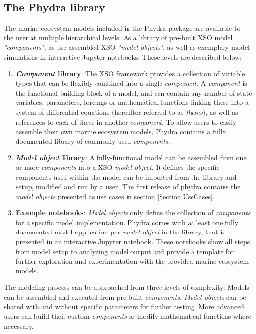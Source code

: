 \documentclass[journal abbreviation, manuscript]{copernicus}
\begin{document}
\subsection{The Phydra library} \label{Section:PhydraLibrary}
The marine ecosystem models included in the Phydra package are available to the user at multiple hierarchical levels: As a library of pre-built XSO model \textit{"components"}, as pre-assembled XSO \textit{"model objects"}, as well as exemplary model simulations in interactive Jupyter notebooks. These levels are described below:
\begin{enumerate}
    \item \textbf{\textit{Component} library}: The XSO framework provides a collection of variable types that can be flexibly combined into a single \textit{component}. A \textit{component} is the functional building block of a model, and can contain any number of state variables, parameters, forcings or mathematical functions linking these into a system of differential equations (hereafter referred to as \textit{fluxes}), as well as references to each of these in another \textit{component}. To allow users to easily assemble their own marine ecosystem models, Phydra contains a fully documented library of commonly used \textit{components}.
    
    \item \textbf{\textit{Model object} library}: A fully-functional model can be assembled from one or more \textit{components} into a XSO \textit{model object}. It defines the specific components used within the model can be imported from the library and setup, modified and run by a user. The first release of phydra contains the \textit{model objects} presented as use cases in section \ref{Section:UseCases}.
    
    \item \textbf{Example notebooks}: \textit{Model objects} only define the collection of \textit{components} for a specific model implementation. Phydra comes with at least one fully documented model application per \textit{model object} in the library, that is presented in an interactive Jupyter notebook. These notebooks show all steps from model setup to analyzing model output and provide a template for further exploration and experimentation with the provided marine ecosystem models.
\end{enumerate}

The modeling process can be approached from three levels of complexity: Models can be assembled and executed from pre-built \textit{components}. \textit{Model objects} can be shared with and without specific parameters for further testing. More advanced users can build their custom \textit{components} or modify mathematical functions where necessary.
\end{document}
